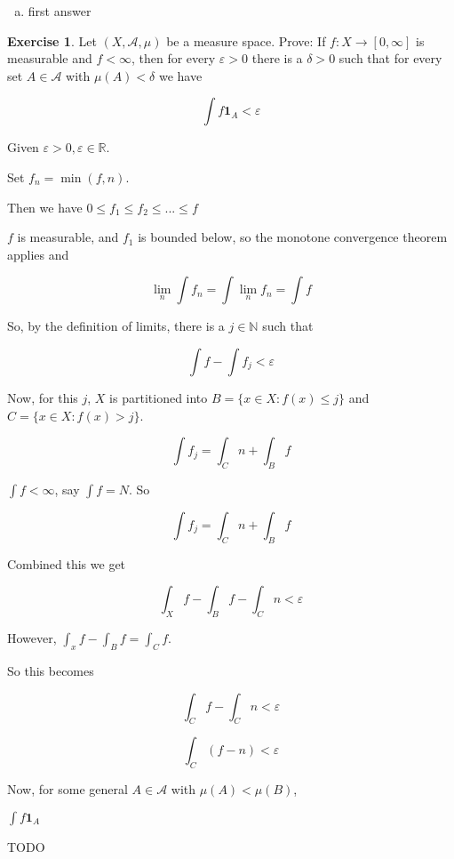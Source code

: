 \documentclass[11pt,oneside]{article}
\numberwithin{equation}{section}
\theoremstyle{definition}
\newtheorem{exercise}{Exercise}
\def\RR{\mathbb{R}}
\def\NN{\mathbb{N}}
\def\fancyA{\mathscr{A}}
\def\limn{\lim \limits _n}
\def\one{\mathbf{1}}
\begin{document}
\begin{solution}
\begin{enumerate}[(a)]
\item
  first answer
\end{enumerate}
\end{solution}
\begin{exercise}
  Let $(X, \fancyA, \mu)$ be a measure space.  Prove:
  If $f: X \to [0, \infty]$ is measurable and $ f < \infty$, then
  for every $\varepsilon > 0$ there is a $\delta > 0$ such that
  for every set $A \in \fancyA$ with $\mu(A) < \delta$ we
  have

  \[
  \int f \one_A < \varepsilon
  \]
  
\end{exercise}
\begin{solution}

  Given $ \varepsilon > 0, \varepsilon \in \RR$.  
  
  Set $f_n = \min(f, n)$.  
  
  Then we have $0 \leq f_1 \leq f_2 \leq ... \leq f$

  $f$ is measurable, and $f_1$ is bounded below, so the monotone convergence theorem applies and

  \[
  \limn \int f_n = \int \limn f_n = \int f
  \]

  So, by the definition of limits, there is a $j \in \NN$ such that

  \[
  \int f - \int f_j < \varepsilon
  \]

  Now, for this $j$, $X$ is partitioned into $ B = \{ x \in X : f(x) \leq j \}$
  and $ C = \{ x \in X : f(x) > j \} $.

  \[
  \int f_j = \int _ C n + \int _B f
  \]

  $ \int f < \infty$, say $\int f = N$.  So

  \[
  \int f_j = \int _C n + \int _B f
  \]

  Combined this we get

  \[
  \int _X f - \int _B f - \int _C n < \varepsilon
  \]
  
  However, $\int_x f - \int_B f  = \int_C f$. 

  So this becomes
  
  \[
  \int_C f - \int_C n < \varepsilon
  \]

  \[
  \int_C (f - n) < \varepsilon
  \]

  Now, for some general $A \in \fancyA$ with $\mu(A) < \mu(B)$,

  $\int f \one _ A $

  TODO
  
\end{solution}
\end{document}
